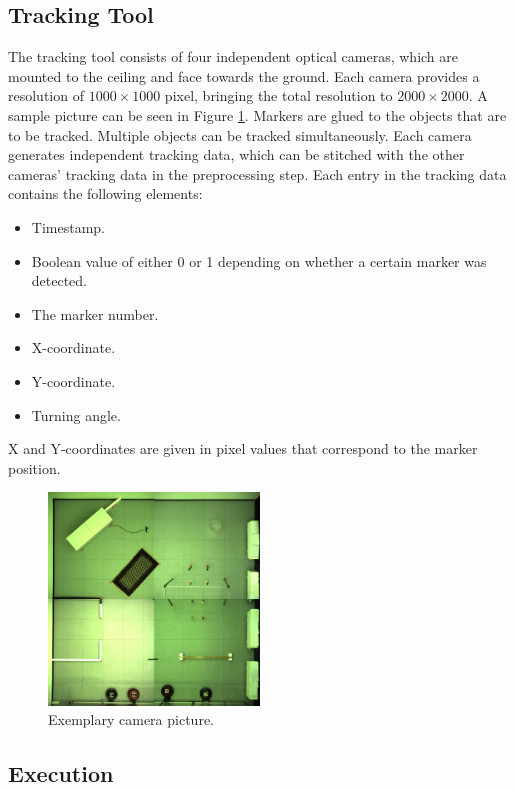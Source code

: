 \documentclass[twoside]{article}
\begin{document}
\subsection{Tracking Tool} %
The tracking tool consists of four independent optical cameras, which are mounted to the ceiling and face towards the ground. Each camera provides a resolution of $1000 \times 1000$ pixel, bringing the total resolution to $2000 \times 2000$. A sample picture can be seen in Figure \ref{fig:setup}. Markers are glued to the objects that are to be tracked. Multiple objects can be tracked simultaneously. Each camera generates independent tracking data, which can be stitched with the other cameras' tracking data in the preprocessing step. Each entry in the tracking data contains the following elements:

\begin{itemize}
	\item Timestamp.
	\item Boolean value of either 0 or 1 depending on whether a certain marker was detected.
	\item The marker number. 
	\item X-coordinate.
	\item Y-coordinate.
	\item Turning angle.
\end{itemize}
X and Y-coordinates are given in pixel values that correspond to the marker position. 

\begin{figure} [H]
	\begin{centering}
		\includegraphics[width=0.5\textwidth]{pictures/setup.jpg}
		\caption{Exemplary camera picture.}
		\label{fig:setup}
	\end{centering}
\end{figure}


\subsection{Execution} %
\end{document}
